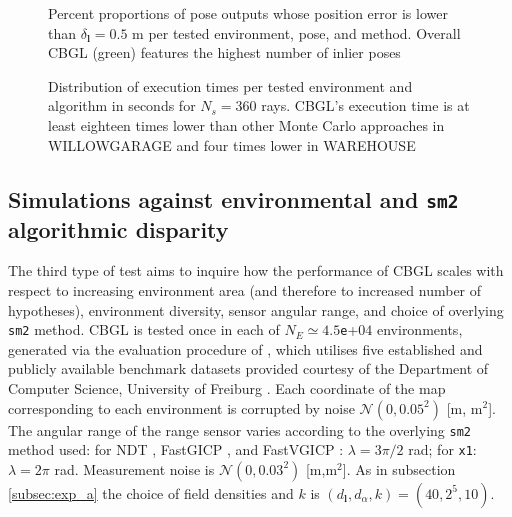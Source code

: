\begin{figure}
  
  \caption{\small Percent proportions of pose outputs whose position error is
           lower than $\delta_{\bm{l}} = 0.5$ m per tested environment, pose,
           and method. Overall CBGL (green) features the highest number of
           inlier poses}
  \label{fig:b:inliers_per_pose}
\end{figure}

\begin{figure}
  
  \vspace{0.1cm}
  \caption{\small Distribution of execution times per tested environment and
           algorithm in seconds for $N_s = 360$ rays. CBGL's execution time is
           at least eighteen times lower than other Monte Carlo approaches in
           WILLOWGARAGE and four times lower in WAREHOUSE}
  \label{fig:b:execution_times}
  \vspace{-0.5cm}
\end{figure}


\subsection{Simulations against environmental and \texttt{sm2} algorithmic disparity }
\label{subsec:exp_c}

The third type of test aims to inquire how the performance of CBGL scales with
respect to increasing environment area (and therefore to increased number of
hypotheses), environment diversity, sensor angular range, and choice of
overlying \texttt{sm2} method. CBGL is tested once in each of
$N_E \simeq 4.5$\texttt{e}+$04$ environments, generated via the evaluation
procedure of \cite{Filotheou2023a}, which utilises five established and
publicly available benchmark datasets provided courtesy of the Department of
Computer Science, University of Freiburg \cite{datasets_link}.  Each coordinate
of the map corresponding to each environment is corrupted by noise
$\mathcal{N}(0,0.05^2)$ [m, m$^2$]. The angular range of the range sensor
varies according to the overlying \texttt{sm2} method used: for
NDT \cite{ndt}, FastGICP \cite{fgi}, and FastVGICP \cite{fvg}: $\lambda =
3\pi/2$ rad; for \texttt{x1}: $\lambda = 2\pi$ rad. Measurement noise is
$\mathcal{N}(0,0.03^2)$ [m,m$^2$]. As in subsection \ref{subsec:exp_a} the
choice of field densities and $k$ is $(d_{\bm{l}},d_{\alpha},k) = (40, 2^5,
10)$.

